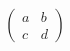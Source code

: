 \documentclass{article}
\begin{document}
\begin {equation}
    \begin {pmatrix}
        a & b \\
        c & d
    \end {pmatrix}
\end {equation}
\end{document}
